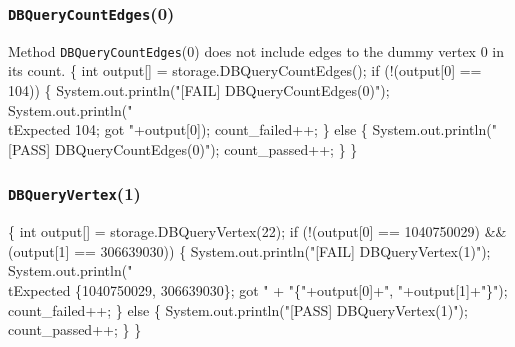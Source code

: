 \documentclass{article}
\def\nwendcode{\endtrivlist \endgroup}
\let\nwdocspar=\par
\begin{document}
\subsubsection{{\tt{}DBQueryCountEdges}(0)}
Method {\tt{}DBQueryCountEdges}(0) does not include edges to the dummy vertex 0 in
its count.
\nwenddocs{}\endmoddef{}
\{
  int output[] = storage.DBQueryCountEdges();
  if (!(output[0] == 104)) \{
    System.out.println("[FAIL] DBQueryCountEdges(0)");
    System.out.println("\\tExpected 104; got "+output[0]);
    count_failed++;
  \} else \{
    System.out.println("[PASS] DBQueryCountEdges(0)");
    count_passed++;
  \}
\}
\nwendcode{}\nwdocspar
\subsubsection{{\tt{}DBQueryVertex}(1)}
\nwenddocs{}\endmoddef{}
\{
  int output[] = storage.DBQueryVertex(22);
  if (!(output[0] == 1040750029)
    && (output[1] == 306639030)) \{
    System.out.println("[FAIL] DBQueryVertex(1)");
    System.out.println("\\tExpected \{1040750029, 306639030\}; got "
      + "\{"+output[0]+", "+output[1]+"\}");
    count_failed++;
  \} else \{
    System.out.println("[PASS] DBQueryVertex(1)");
    count_passed++;
  \}
\}
\nwendcode{}\nwdocspar
\end{document}
